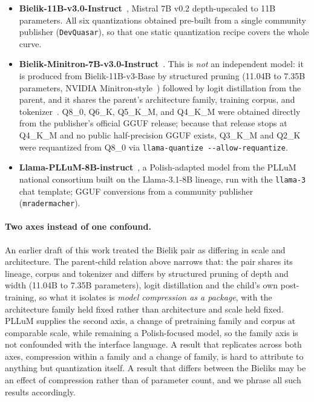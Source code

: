 \documentclass[11pt]{article}
\begin{document}
\begin{itemize}
  \item \textbf{Bielik-11B-v3.0-Instruct}~\cite{bielik11bv3,bielik11bv3card}, Mistral 7B v0.2 depth-upscaled to 11B parameters. All six quantizations obtained pre-built from a single community publisher (\texttt{DevQuasar}), so that one static quantization recipe covers the whole curve.
  \item \textbf{Bielik-Minitron-7B-v3.0-Instruct}~\cite{bielikminitron,bielikminitroncard}. This is \emph{not} an independent model: it is produced from Bielik-11B-v3-Base by structured pruning (11.04B to 7.35B parameters, NVIDIA Minitron-style~\cite{minitron}) followed by logit distillation from the parent, and it shares the parent's architecture family, training corpus, and tokenizer~\cite{bielikminitron}. Q8\_0, Q6\_K, Q5\_K\_M, and Q4\_K\_M were obtained directly from the publisher's official GGUF release; because that release stops at Q4\_K\_M and no public half-precision GGUF exists, Q3\_K\_M and Q2\_K were requantized from Q8\_0 via \texttt{llama-quantize -{}-allow-requantize}.
  \item \textbf{Llama-PLLuM-8B-instruct}~\cite{pllum}, a Polish-adapted model from the PLLuM national consortium built on the Llama-3.1-8B lineage, run with the \texttt{llama-3} chat template; GGUF conversions from a community publisher (\texttt{mradermacher}).
\end{itemize}

\paragraph{Two axes instead of one confound.} An earlier draft of this work treated the Bielik pair as differing in scale and architecture. The parent-child relation above narrows that: the pair shares its lineage, corpus and tokenizer and differs by structured pruning of depth and width (11.04B to 7.35B parameters), logit distillation and the child's own post-training, so what it isolates is \emph{model compression as a package}, with the architecture family held fixed rather than architecture and scale held fixed. PLLuM supplies the second axis, a change of pretraining family and corpus at comparable scale, while remaining a Polish-focused model, so the family axis is not confounded with the interface language. A result that replicates across both axes, compression within a family and a change of family, is hard to attribute to anything but quantization itself. A result that differs between the Bieliks may be an effect of compression rather than of parameter count, and we phrase all such results accordingly.
\end{document}
